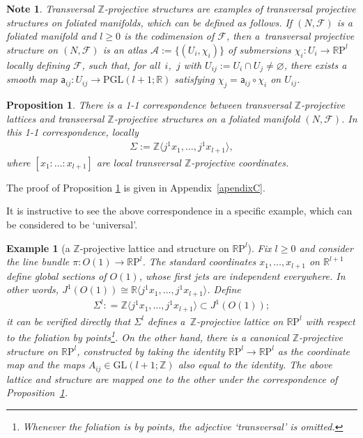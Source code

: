 \documentclass[10pt,a4paper]{amsart}
\numberwithin{equation}{section}
\newtheorem{Proposition}[Theorem]{Proposition}
\newtheorem{Note}[Theorem]{Note}
\newtheorem{Example}[Theorem]{Example}
\newcommand{\RR}{\mathbb{R}}
\newcommand{\ZZ}{\mathbb{Z}}
\begin{document}
\begin{Note}\label{obs:trans_proj_structure}
Transversal $\ZZ$-projective structures are examples of {\it transversal projective structures} on foliated manifolds, which can be def\/ined as follows. If $(N,\mathcal{F})$ is a foliated manifold and $l \geq 0$ is the codimension of $\mathcal{F}$, then a~transversal projective structure on $(N,\mathcal{F})$ is an atlas $\mathcal{A} :=\{(U_i, \chi_i)\}$ of submersions $\chi_i \colon U_i \to \RR\mathrm{P}^l$ locally def\/ining $\mathcal{F}$, such that, for all~$i$,~$j$ with $U_{ij} := U_i \cap U_j \neq \varnothing$, there exists a smooth map $\mathsf{a}_{ij}\colon U_{ij} \to \mathrm{PGL}(l+1;\RR)$ satisfying $\chi_j = \mathsf{a}_{ij}\circ \chi_i$ on $U_{ij}$.
 \end{Note}

\begin{Proposition}\label{thm:tilp_tilpa}
 There is a {\rm 1-1} correspondence between transversal $\ZZ$-projective lattices and transversal $\ZZ$-projective structures on a foliated manifold $(N,\mathcal{F})$. In this {\rm 1-1} correspondence, locally
 \begin{gather*}
 \Sigma := \ZZ \big\langle j^1x_1,\ldots, j^1x_{l+1} \big\rangle,
 \end{gather*}
where $[x_1:\ldots:x_{l+1}]$ are local transversal $\ZZ$-projective
 coordinates.
\end{Proposition}

The proof of Proposition \ref{thm:tilp_tilpa} is given in Appendix~\ref{apendixC}.

It is instructive to see the above correspondence in a specif\/ic example, which can be considered to be `universal'.

\begin{Example}[a $\ZZ$-projective lattice and structure on $\mathbb{R}\mathrm{P}^l$]\label{ex:projective_plane}
Fix $l \geq 0$ and consider the line bundle $\pi\colon O(1) \to \RR \mathrm{P}^l$. The standard coordinates $x_1,\ldots,x_{l+1}$ on $\RR^{l+1}$ def\/ine global sections of $O(1)$, whose f\/irst jets are independent everywhere. In other words, $J^1(O(1)) \cong \RR \langle j^1x_1,\ldots,j^1x_{l+1} \rangle$. Def\/ine
\begin{gather*}
 \Sigma^{l} : = \ZZ \big\langle j^1x_1,\ldots,j^1x_{l+1} \big\rangle \subset J^1(O(1));
 \end{gather*}
it can be verif\/ied directly that $\Sigma^l$ def\/ines a~$\ZZ$-projective lattice on $\RR\mathrm{P}^l$ with respect to the foliation by points\footnote{Whenever the foliation is by points, the adjective `transversal' is omitted.}. On the other hand, there is a canonical $\ZZ$-projective structure on $\RR\mathrm{P}^l$, constructed by taking the identity $\RR\mathrm{P}^l \to \RR \mathrm{P}^l$ as the coordinate map and the maps $A_{ij} \in \mathrm{GL}(l+1;\ZZ)$ also equal to the identity. The above lattice and structure are mapped one to the other under the correspondence of Proposition~\ref{thm:tilp_tilpa}.
\end{Example}
\end{document}
